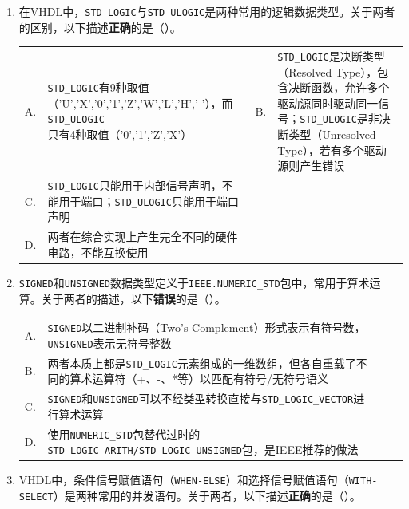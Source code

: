 \begin{enumerate}[label=\arabic*.]

\item 在VHDL中，\texttt{STD\_LOGIC}与\texttt{STD\_ULOGIC}是两种常用的逻辑数据类型。关于两者的区别，以下描述\textbf{正确}的是（\quad）。

\vspace{0.3cm}

\begin{tabular}{@{}lp{}@{\qquad}lp{}@{}}
A. & \texttt{STD\_LOGIC}有9种取值（'U','X','0','1','Z','W','L','H','-'），而\texttt{STD\_ULOGIC}只有4种取值（'0','1','Z','X'） &
B. & \texttt{STD\_LOGIC}是决断类型（Resolved Type），包含决断函数，允许多个驱动源同时驱动同一信号；\texttt{STD\_ULOGIC}是非决断类型（Unresolved Type），若有多个驱动源则产生错误 \\
C. & \texttt{STD\_LOGIC}只能用于内部信号声明，不能用于端口；\texttt{STD\_ULOGIC}只能用于端口声明 \\
D. & 两者在综合实现上产生完全不同的硬件电路，不能互换使用 \\
\end{tabular}

\vspace{0.8cm}

\item \texttt{SIGNED}和\texttt{UNSIGNED}数据类型定义于\texttt{IEEE.NUMERIC\_STD}包中，常用于算术运算。关于两者的描述，以下\textbf{错误}的是（\quad）。

\vspace{0.3cm}

\begin{tabular}{@{}lp{}@{\qquad}lp{}@{}}
A. & \texttt{SIGNED}以二进制补码（Two's Complement）形式表示有符号数，\texttt{UNSIGNED}表示无符号整数 \\
B. & 两者本质上都是\texttt{STD\_LOGIC}元素组成的一维数组，但各自重载了不同的算术运算符（+、-、*等）以匹配有符号/无符号语义 \\
C. & \texttt{SIGNED}和\texttt{UNSIGNED}可以不经类型转换直接与\texttt{STD\_LOGIC\_VECTOR}进行算术运算 \\
D. & 使用\texttt{NUMERIC\_STD}包替代过时的\texttt{STD\_LOGIC\_ARITH/STD\_LOGIC\_UNSIGNED}包，是IEEE推荐的做法 \\
\end{tabular}

\vspace{0.8cm}

\item VHDL中，条件信号赋值语句（\texttt{WHEN-ELSE}）和选择信号赋值语句（\texttt{WITH-SELECT}）是两种常用的并发语句。关于两者，以下描述\textbf{正确}的是（\quad）。


\end{enumerate}
